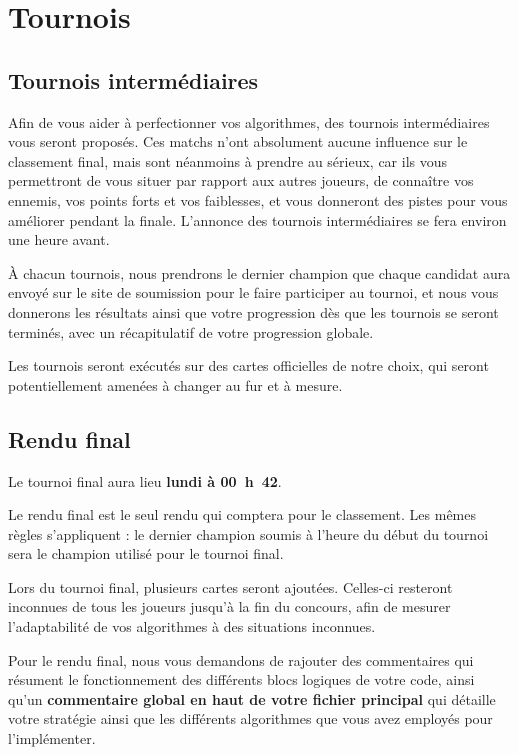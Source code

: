 
\section{Tournois}

\subsection{Tournois intermédiaires}

Afin de vous aider à perfectionner vos algorithmes, des tournois intermédiaires
vous seront proposés. Ces matchs n'ont absolument aucune influence sur le
classement final, mais sont néanmoins à prendre au sérieux, car ils vous
permettront de vous situer par rapport aux autres joueurs, de connaître vos
ennemis, vos points forts et vos faiblesses, et vous donneront des pistes pour
vous améliorer pendant la finale. L'annonce des tournois intermédiaires se fera
environ une heure avant.

À chacun tournois, nous prendrons le dernier champion que chaque candidat aura
envoyé sur le site de soumission pour le faire participer au tournoi, et nous
vous donnerons les résultats ainsi que votre progression dès que les tournois se
seront terminés, avec un récapitulatif de votre progression globale.

Les tournois seront exécutés sur des cartes officielles de notre choix, qui
seront potentiellement amenées à changer au fur et à mesure.

\subsection{Rendu final}

Le tournoi final aura lieu \textbf{lundi à 00~h~42}.

Le rendu final est le seul rendu qui comptera pour le classement. Les mêmes
règles s'appliquent : le dernier champion soumis à l'heure du début du tournoi
sera le champion utilisé pour le tournoi final.

Lors du tournoi final, plusieurs cartes seront ajoutées. Celles-ci resteront
inconnues de tous les joueurs jusqu'à la fin du concours, afin de mesurer
l'adaptabilité de vos algorithmes à des situations inconnues.

Pour le rendu final, nous vous demandons de rajouter des commentaires qui
résument le fonctionnement des différents blocs logiques de votre code, ainsi
qu'un \textbf{commentaire global en haut de votre fichier principal} qui
détaille votre stratégie ainsi que les différents algorithmes que vous avez
employés pour l'implémenter.

